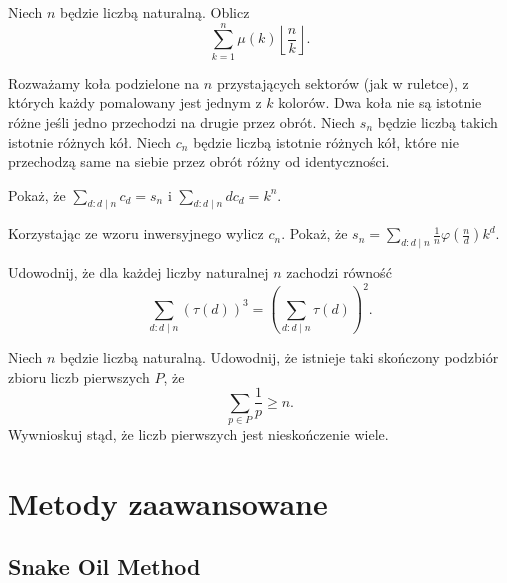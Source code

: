 \documentclass[shortabstract]{imthesis}
\begin{document}
\begin{problem} \label{problem:summufloor}
    Niech $n$ będzie liczbą naturalną. Oblicz
    $$
    \sum_{k=1}^n \mu(k) \left\lfloor \frac{n}{k} \right\rfloor.
    $$
\end{problem}

\begin{problem} \label{problem:cdsn}
    Rozważamy koła podzielone na $n$ przystających sektorów (jak w ruletce), z których każdy pomalowany jest jednym z $k$ kolorów. Dwa koła nie są istotnie różne jeśli jedno przechodzi na drugie przez obrót. Niech $s_n$ będzie liczbą takich istotnie różnych kół. Niech $c_n$ będzie liczbą istotnie różnych kół, które nie przechodzą same na siebie przez obrót różny od identyczności.

    Pokaż, że $\sum_{d : d \mid n} c_d = s_n$ i $\sum_{d : d \mid n} dc_d = k^n$.
    
    Korzystając ze wzoru inwersyjnego wylicz $c_n$. Pokaż, że $s_n = \sum_{d : d \mid n} \frac{1}{n} \varphi\left(\frac{n}{d}\right)k^d$.
\end{problem}

\begin{problem} \label{problem:tau3sumtau2}
    Udowodnij, że dla każdej liczby naturalnej $n$ zachodzi równość
    $$
    \sum_{d : d \mid n} (\tau(d))^3 = \left(\sum_{d : d \mid n} \tau(d)\right)^2.
    $$
\end{problem}

\begin{problem} \label{problem:pinvdiv}
    Niech $n$ będzie liczbą naturalną. Udowodnij, że istnieje taki skończony podzbiór zbioru liczb pierwszych $P$, że
    $$
    \sum_{p \in P} \frac{1}{p} \geq n.
    $$
    Wywnioskuj stąd, że liczb pierwszych jest nieskończenie wiele.
\end{problem}

\chapter{Metody zaawansowane}

\section{Snake Oil Method}
\end{document}
